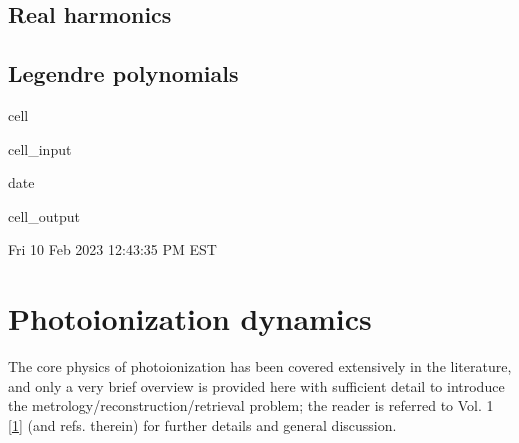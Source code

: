 \documentclass[letterpaper,table,10pt,english]{jupyterBook}
\begin{document}
\subsection{Real harmonics}
\label{\detokenize{part1/theory_observables_intro_211122:real-harmonics}}

\subsection{Legendre polynomials}
\label{\detokenize{part1/theory_observables_intro_211122:legendre-polynomials}}
\begin{sphinxuseclass}{cell}\begin{sphinxVerbatimInput}

\begin{sphinxuseclass}{cell_input}
\begin{sphinxVerbatim}[commandchars=\\\{\}]
date
\end{sphinxVerbatim}

\end{sphinxuseclass}\end{sphinxVerbatimInput}
\begin{sphinxVerbatimOutput}

\begin{sphinxuseclass}{cell_output}
\begin{sphinxVerbatim}[commandchars=\\\{\}]
Fri 10 Feb 2023 12:43:35 PM EST
\end{sphinxVerbatim}

\end{sphinxuseclass}\end{sphinxVerbatimOutput}

\end{sphinxuseclass}
\sphinxstepscope


\section{Photoionization dynamics}
\label{\detokenize{part1/theory_photoionization_dynamics_191122:photoionization-dynamics}}\label{\detokenize{part1/theory_photoionization_dynamics_191122:sec-dynamics-intro}}\label{\detokenize{part1/theory_photoionization_dynamics_191122::doc}}
\sphinxAtStartPar
The core physics of photoionization has been covered extensively in the literature, and only a very brief overview is provided here with sufficient detail to introduce the metrology/reconstruction/retrieval problem; the reader is referred to Vol. 1 {[}\hyperlink{cite.backmatter/bibliography:id569}{1}{]} (and refs. therein) for further details and general discussion.
\end{document}

